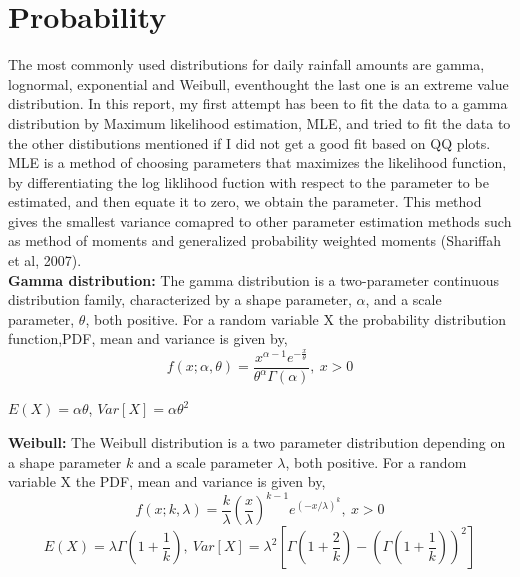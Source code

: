 \documentclass{article}
\begin{document}
	\section{Probability}
	The most commonly used distributions for daily rainfall amounts are gamma, lognormal, exponential and Weibull, eventhought the last one is an extreme value distribution. In this report, my first attempt has been to fit the data to a gamma distribution by Maximum likelihood estimation, MLE, and tried to fit the data to the other distibutions mentioned if I did not get a good fit based on QQ plots. MLE is a method of choosing parameters that maximizes the likelihood function, by differentiating the log liklihood fuction with respect to the parameter to be estimated, and then equate it to zero, we obtain the parameter. This method gives the smallest variance comapred to other parameter estimation methods such as method of moments and generalized probability weighted moments (Shariffah et al, 2007). \\
	\textbf{Gamma distribution: } The gamma distribution is a two-parameter continuous distribution family, characterized by a shape parameter, $\alpha$, and a scale parameter, $\theta$, both positive. For a random variable X the probability distribution function,PDF, mean and variance is given by,
	\begin{equation*}
	f(x ; \alpha, \theta) = \frac{x^{\alpha-1} e^{-\frac{x}{\theta}}}{\theta^\alpha \Gamma(\alpha)}, \ x > 0
	\end{equation*}
	\begin{center}
		$E(X) = \alpha\theta$, $Var[X] = \alpha\theta^2$
	\end{center}
	\textbf{Weibull: }The Weibull distribution is a two parameter distribution depending on a shape parameter $k$ and a scale parameter $\lambda$, both positive. For a random variable X the PDF, mean and variance is given by,
	\begin{equation*}
	f(x ; k, \lambda) = \frac{k}{\lambda}\left(\frac{x}{\lambda}\right)^{k-1}e^{(-x/ \lambda)^k}, \ x> 0
	\end{equation*}
	\begin{equation*}
	E(X) = \lambda\Gamma\left(1+\frac{1}{k}\right), \ Var[X] = \lambda^2\left[\Gamma\left(1 + \frac{2}{k}\right)- \left(\Gamma\left(1 + \frac{1}{k}\right)\right)^2\right]
	\end{equation*}
\end{document}
